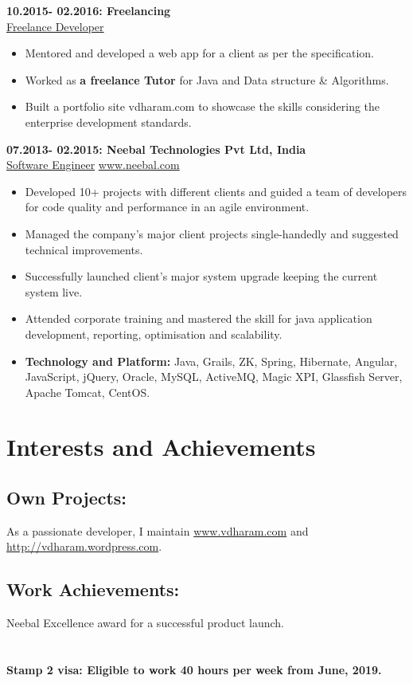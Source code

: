 \documentclass{article}
\begin{document}
\textbf{10.2015- 02.2016: \hfill Freelancing\\}
\underline{Freelance Developer}
\begin{itemize}
	\itemsep0em
	\item Mentored and developed a web app for a client as per the specification.
	\item Worked as \textbf{a freelance Tutor} for Java and Data structure \& Algorithms.
	\item Built a portfolio site vdharam.com to showcase the skills considering the enterprise development standards.
\end{itemize}
\textbf{07.2013- 02.2015: \hfill Neebal Technologies Pvt Ltd, India \\}
\underline{Software Engineer} \hfill \href{www.neebal.com}{www.neebal.com}
\begin{itemize}
	\itemsep0em
	\item Developed 10+ projects with different clients and guided a team of developers for code quality and performance in an agile environment.
	\item Managed the company’s major client projects single-handedly and suggested technical improvements.
	\item Successfully launched client’s major system upgrade keeping the current system live.
	\item Attended corporate training and mastered the skill for java application development, reporting, optimisation and scalability.
	\item \textbf{Technology and Platform:} Java, Grails, ZK, Spring, Hibernate, Angular, JavaScript, jQuery, Oracle, MySQL, ActiveMQ, Magic XPI, Glassfish Server, Apache Tomcat, CentOS.
\end{itemize}

\section{Interests and Achievements}
\subsection{Own Projects:}
As a passionate developer, I maintain \href{www.vdharam.com}{www.vdharam.com} and \href{http://vdharam.wordpress.com}{http://vdharam.wordpress.com}.
\subsection{Work Achievements:}
Neebal Excellence award for a successful product launch.

\section{}
\bfseries
Stamp 2 visa: Eligible to work 40 hours per week from June, 2019.
\end{document}
